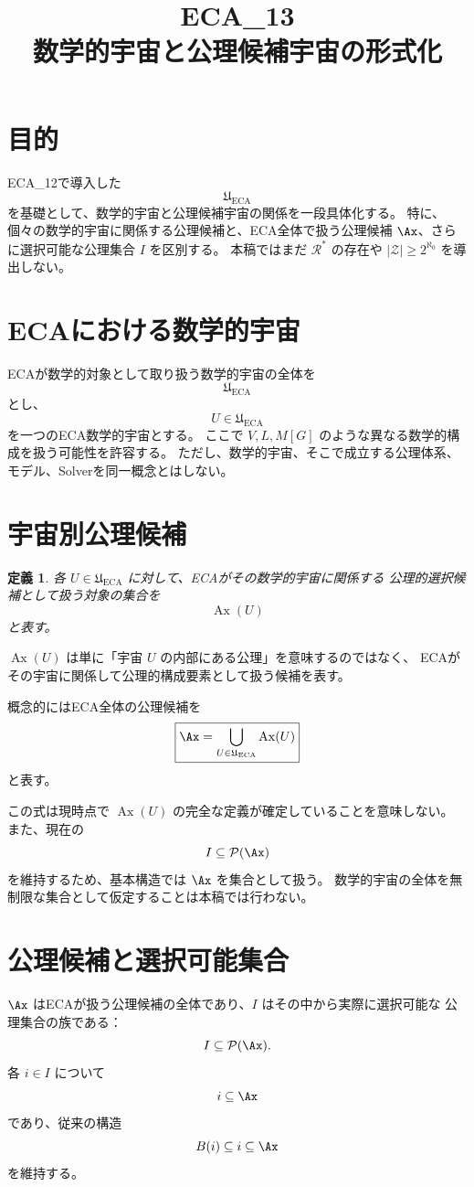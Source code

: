 \documentclass[11pt,a4paper]{article}
\title{ECA\_13\\数学的宇宙と公理候補宇宙の形式化}
\author{}\date{}
\newtheorem{definition}{定義}
\begin{document}
\maketitle

\section{目的}
ECA\_12で導入した
\[
\mathfrak U_{\mathrm{ECA}}
\]
を基礎として、数学的宇宙と公理候補宇宙の関係を一段具体化する。
特に、個々の数学的宇宙に関係する公理候補と、ECA全体で扱う公理候補
\(\Ax\)、さらに選択可能な公理集合 \(I\) を区別する。
本稿ではまだ \(\mathcal R^*\) の存在や
\(|\mathcal Z|\ge2^{\aleph_0}\) を導出しない。

\section{ECAにおける数学的宇宙}
ECAが数学的対象として取り扱う数学的宇宙の全体を
\[
\mathfrak U_{\mathrm{ECA}}
\]
とし、
\[
U\in\mathfrak U_{\mathrm{ECA}}
\]
を一つのECA数学的宇宙とする。
ここで \(V,L,M[G]\) のような異なる数学的構成を扱う可能性を許容する。
ただし、数学的宇宙、そこで成立する公理体系、モデル、Solverを同一概念とはしない。

\section{宇宙別公理候補}
\begin{definition}
各 \(U\in\mathfrak U_{\mathrm{ECA}}\) に対して、ECAがその数学的宇宙に関係する
公理的選択候補として扱う対象の集合を
\[
\operatorname{Ax}(U)
\]
と表す。
\end{definition}

\(\operatorname{Ax}(U)\) は単に「宇宙 \(U\) の内部にある公理」を意味するのではなく、
ECAがその宇宙に関係して公理的構成要素として扱う候補を表す。

概念的にはECA全体の公理候補を
\[
\boxed{
\Ax=
\bigcup_{U\in\mathfrak U_{\mathrm{ECA}}}\operatorname{Ax}(U)
}
\]
と表す。

この式は現時点で \(\operatorname{Ax}(U)\) の完全な定義が確定していることを意味しない。
また、現在の
\[
I\subseteq\mathcal P(\Ax)
\]
を維持するため、基本構造では \(\Ax\) を集合として扱う。
数学的宇宙の全体を無制限な集合として仮定することは本稿では行わない。

\section{公理候補と選択可能集合}
\(\Ax\) はECAが扱う公理候補の全体であり、\(I\) はその中から実際に選択可能な
公理集合の族である：
\[
I\subseteq\mathcal P(\Ax).
\]
各 \(i\in I\) について
\[
i\subseteq\Ax
\]
であり、従来の構造
\[
B(i)\subseteq i\subseteq\Ax
\]
を維持する。
\end{document}

